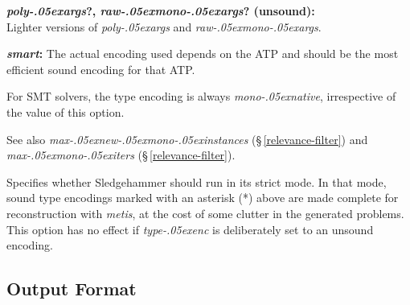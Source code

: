 \documentclass[a4paper,12pt]{article}
\let\oldS=\S
\def\S{\oldS\,}
\renewcommand\_{\hbox{\textunderscore\kern-.05ex}}
\begin{document}
\begin{enum}
\begin{enum}
\item[\labelitemi] \textbf{\textit{poly\_args}?, \textit{raw\_mono\_args}? (unsound):} \\
Lighter versions of \textit{poly\_args} and \textit{raw\_mono\_args}.

\item[\labelitemi] \textbf{\textit{smart}:} The actual encoding used depends on
the ATP and should be the most efficient sound encoding for that ATP.
\end{enum}

For SMT solvers, the type encoding is always \textit{mono\_native}, irrespective
of the value of this option.

\nopagebreak
{\small See also \textit{max\_new\_mono\_instances} (\S\ref{relevance-filter})
and \textit{max\_mono\_iters} (\S\ref{relevance-filter}).}

\opfalse{strict}{non\_strict}
Specifies whether Sledgehammer should run in its strict mode. In that mode,
sound type encodings marked with an asterisk (*) above are made complete
for reconstruction with \textit{metis}, at the cost of some clutter in the
generated problems. This option has no effect if \textit{type\_enc} is
deliberately set to an unsound encoding.
\end{enum}

\subsection{Output Format}
\label{output-format}
\end{document}
